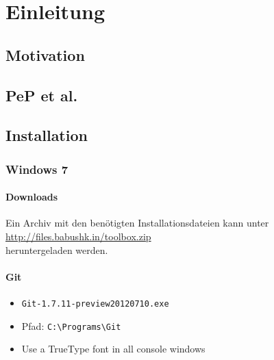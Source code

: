 \chapter{Einleitung}
\section{Motivation}
\section{PeP et al.}

\section{Installation}
\subsection{Windows 7}
\subsubsection{Downloads}
  Ein Archiv mit den benötigten Installationsdateien kann unter \\
  \url{http://files.babushk.in/toolbox.zip} \\
  heruntergeladen werden.
\subsubsection{Git}
\begin{itemize}
  \item \texttt{Git-1.7.11-preview20120710.exe}
  \item Pfad: \verb|C:\Programs\Git|
  \item Use a TrueType font in all console windows
\end{itemize}

